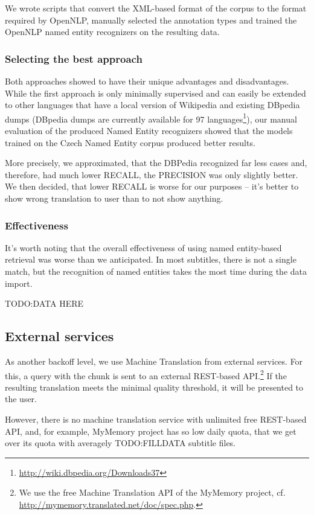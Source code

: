 We wrote scripts that convert the XML-based format of the corpus to the format required by OpenNLP, 
manually selected the annotation types and trained the OpenNLP named entity recognizers on the resulting data.


\subsubsection*{Selecting the best approach}

Both approaches showed to have their unique advantages and disadvantages. While the first approach is only minimally supervised
and can easily be extended to other languages that have a local version of Wikipedia and existing DBpedia dumps (DBpedia dumps are currently available for 97 languages\footnote{\url{http://wiki.dbpedia.org/Downloads37}}), our manual evaluation of the produced Named Entity recognizers showed that the models trained on the Czech Named Entity corpus produced better results.

More precisely, we approximated, that the DBPedia recognized far less cases and, therefore, had much lower RECALL, the PRECISION was only slightly better. We then decided, that lower RECALL is worse for our purposes -- it's better to show wrong translation to user than to not show anything.

\subsubsection*{Effectiveness}
It's worth noting that the overall effectiveness of using named entity-based retrieval was worse than we anticipated. In most subtitles, there is not a single match, but the recognition of named entities takes the most time during the data import.  

TODO:DATA HERE

\subsection{External services}

As another backoff level, we use Machine Translation from external services.
For this, a query with the chunk is sent to an external REST-based
API.\footnote{We use the free Machine Translation API of the MyMemory project, cf. \url{http://mymemory.translated.net/doc/spec.php}.}
If the resulting translation meets the minimal quality threshold, it
will be presented to the user.

However, there is no machine translation service with unlimited free REST-based API, and, for example, MyMemory project has so low daily quota, that we get over its quota with averagely TODO:FILLDATA subtitle files.

